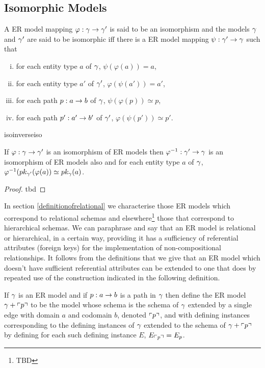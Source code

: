 \subsection{Isomorphic Models}

\begin{definition}
A ER model mapping $\varphi: \gmodel \morph \gmodel'$ is said to be an isomorphism
and the models $\gmodel$ and $\gmodel'$ are said to be isomorphic iff there is a ER model mapping $\psi: \gmodel' \morph \gmodel$ such that
\begin{enumerate}[(i)]
\item for each entity type $a$ of $\gmodel$, $\psi(\varphi(a))=a$,
\item for each entity type $a'$ of $\gmodel'$, $\varphi(\psi(a'))=a'$,
\item for each path $p: a \morph b$ of $\gmodel$, $\psi(\varphi(p)) \simeq p$,
\item for each path $p':a' \morph b'$ of $\gmodel'$, $\varphi(\psi(p')) \simeq p'$.
\end{enumerate}
\end{definition}

isoinverseiso
\begin{lemma}
\label{isoinverseiso}
If $\varphi: \gmodel \morph \gmodel'$ is an isomorphism of ER models then
$\varphi^{-1}: \gmodel' \morph \gmodel$ is an isomorphism of ER models also and
for each entity type $a$ of $\gmodel$, $\varphi^{-1}(\pk[\gmodel']{\varphi(a)}\simeq\pk{a}$.
\end{lemma}
\begin{proof}
tbd
\end{proof}

In section \ref{definitionofrelational} we characterise those ER models which correspond to relational schemas and elsewhere\footnote{TBD} those that correspond to hierarchical schemas. 
We can paraphrase and say that an ER model is relational or hierarchical, in a certain way,  providing it has a sufficiency of referential attributes (foreign keys) for the implementation  of non-compositional relationships. It follows from the definitions that we give that an ER model which doesn't have sufficient 
referential attributes can be extended to one that does by repeated use of the construction indicated in the following definition.
\begin{definition}
If $\gmodel$ is an ER model and if $p:a \morph b$ is a path in $\gmodel$ then define the ER model $\gmodel + \qq{p}$ to be the model whose schema is the schema of $\gmodel$ extended by a single edge with domain $a$ and codomain $b$, denoted $\qq{p}$, and with defining instances corresponding to the defining instances of $\gmodel$ extended to the schema of $\gmodel + \qq{p}$ by defining for each such defining instance $E$, $E_{\qq{p}}=E_p$.
\end{definition} 


